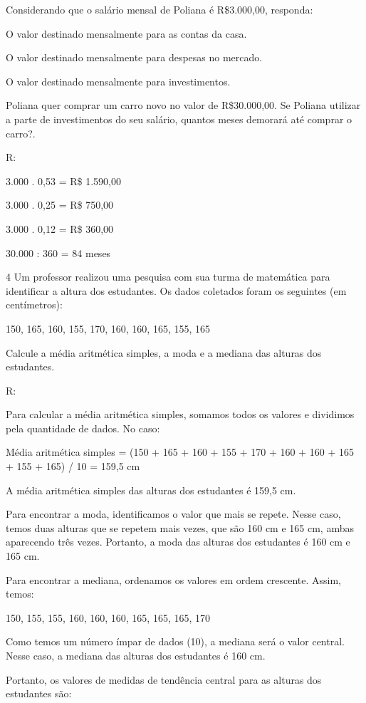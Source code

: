 {Considerando que o salário mensal de Poliana é R\$3.000,00, responda:
\item O valor destinado mensalmente para as contas da casa.
\item O valor destinado mensalmente para despesas no mercado.
\item O valor destinado mensalmente para investimentos.
\item Poliana quer comprar um carro novo no valor de R\$30.000,00. Se
Poliana utilizar a parte de investimentos do seu salário, quantos meses
demorará até comprar o carro?.

R:
\item 3.000 . 0,53 = R\$ 1.590,00
\item 3.000 . 0,25 = R\$ 750,00
\item 3.000 . 0,12 = R\$ 360,00
\item 30.000 : 360 = 84 meses

\num{4} Um professor realizou uma pesquisa com sua turma de matemática para
identificar a altura dos estudantes. Os dados coletados foram os
seguintes (em centímetros):

150, 165, 160, 155, 170, 160, 160, 165, 155, 165

Calcule a média aritmética simples, a moda e a mediana das alturas dos
estudantes.

R:

Para calcular a média aritmética simples, somamos todos os valores e
dividimos pela quantidade de dados. No caso:

Média aritmética simples = (150 + 165 + 160 + 155 + 170 + 160 + 160 +
165 + 155 + 165) / 10 = 159,5 cm

A média aritmética simples das alturas dos estudantes é 159,5 cm.

Para encontrar a moda, identificamos o valor que mais se repete. Nesse
caso, temos duas alturas que se repetem mais vezes, que são 160 cm e 165
cm, ambas aparecendo três vezes. Portanto, a moda das alturas dos
estudantes é 160 cm e 165 cm.

Para encontrar a mediana, ordenamos os valores em ordem crescente.
Assim, temos:

150, 155, 155, 160, 160, 160, 165, 165, 165, 170

Como temos um número ímpar de dados (10), a mediana será o valor
central. Nesse caso, a mediana das alturas dos estudantes é 160 cm.

Portanto, os valores de medidas de tendência central para as alturas dos
estudantes são:

}

